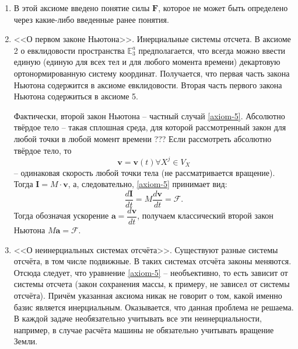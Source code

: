 \begin{remark}
  \begin{enumerate}

    \item В этой аксиоме введено понятие силы $\mathcal{\mathbf{F}}$, которое не может 
      быть определено через какие-либо введенные ранее понятия.

    \item <<О первом законе Ньютона>>. Инерциальные системы отсчета. В 
      аксиоме 2 о евклидовости пространства $\mathbb{E}_3^a$ предполагается, что
      всегда можно ввести единую (единую для всех тел и для любого момента времени)
      декартовую ортонормированную систему координат. Получается, что
      первая часть закона Ньютона содержится в аксиоме евклидовости.
      Вторая часть первого закона Ньютона содержиться в аксиоме 5.

      Фактически, второй закон Ньютона -- частный случай \eqref{axiom-5}.
      Абсолютно твёрдое тело -- такая сплошная среда, для которой рассмотренный
      закон для любой точки в любой момент времени ???
      Если рассмотреть абсолютно твёрдое тело, то 
      \[
        \mathbf{v} = \mathbf{v}(t) \forall X^j \in V_X
      \]
      -- одинаковая скорость любой точки тела (не рассматривается вращение).
      Тогда $\mathbf{I} = M \cdot \mathbf{v}$, а, следовательно, \eqref{axiom-5}
      принимает вид:
      \[
        \dfrac{d\mathbf{I}}{dt} = M \dfrac{d\mathbf{v}}{dt} = \mathbf{\mathcal{F}}.
      \]
      Тогда обозначая ускорение $\mathbf{a} = \dfrac{d\mathbf{v}}{dt}$, 
      получаем классический второй закон Ньютона
      $M\mathbf{a} = \mathbf{\mathcal{F}}$.

    \item <<О неинерциальных системах отсчёта>>. Существуют разные системы 
      отсчёта, в том числе подвижные. В таких системах отсчёта законы меняются.
      Отсюда следует, что уравнение \eqref{axiom-5} -- необъективно, то есть зависит
      от системы отсчета (закон сохранения массы, к примеру, не зависел от
      системы отсчёта). Причём указанная аксиома никак не говорит о том, какой
      именно базис является инерциальным. Оказывается, что данная проблема 
      не решаема. В каждой задаче необязательно учитывать все эти неинерциальности,
      например, в случае расчёта машины не обязательно учитывать вращение Земли.
  \end{enumerate}
\end{remark}

